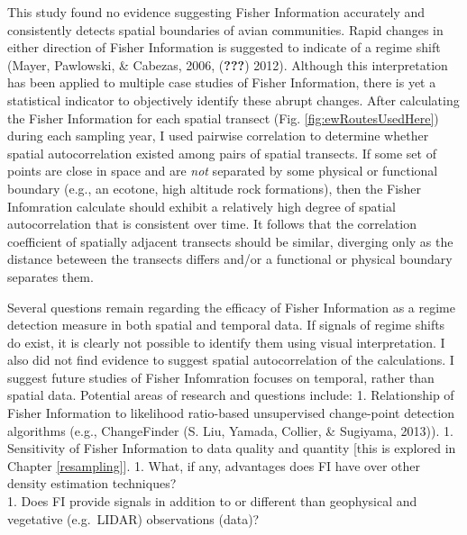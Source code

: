 \documentclass[12pt,twoside,openany]{reedthesis}
\begin{document}
This study found no evidence suggesting Fisher Information accurately
and consistently detects spatial boundaries of avian communities. Rapid
changes in either direction of Fisher Information is suggested to
indicate of a regime shift (Mayer, Pawlowski, \& Cabezas, 2006,
({\textbf{???}}) 2012). Although this interpretation has been applied to
multiple case studies of Fisher Information, there is yet a statistical
indicator to objectively identify these abrupt changes. After
calculating the Fisher Information for each spatial transect (Fig.
\ref{fig:ewRoutesUsedHere}) during each sampling year, I used pairwise
correlation to determine whether spatial autocorrelation existed among
pairs of spatial transects. If some set of points are close in space and
are \emph{not} separated by some physical or functional boundary (e.g.,
an ecotone, high altitude rock formations), then the Fisher Infomration
calculate should exhibit a relatively high degree of spatial
autocorrelation that is consistent over time. It follows that the
correlation coefficient of spatially adjacent transects should be
similar, diverging only as the distance beteween the transects differs
and/or a functional or physical boundary separates them.

Several questions remain regarding the efficacy of Fisher Information as
a regime detection measure in both spatial and temporal data. If signals
of regime shifts do exist, it is clearly not possible to identify them
using visual interpretation. I also did not find evidence to suggest
spatial autocorrelation of the calculations. I suggest future studies of
Fisher Infomration focuses on temporal, rather than spatial data.
Potential areas of research and questions include: 1. Relationship of
Fisher Information to likelihood ratio-based unsupervised change-point
detection algorithms (e.g., ChangeFinder (S. Liu, Yamada, Collier, \&
Sugiyama, 2013)). 1. Sensitivity of Fisher Information to data quality
and quantity {[}this is explored in Chapter \ref{resampling}{]}. 1.
What, if any, advantages does FI have over other density estimation
techniques?\\
1. Does FI provide signals in addition to or different than geophysical
and vegetative (e.g.~LIDAR) observations (data)?
\end{document}
